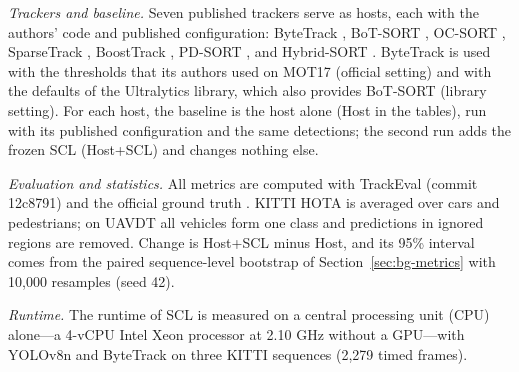 \emph{Trackers and baseline.} Seven published trackers serve as hosts, each with the authors' code and published configuration: ByteTrack \cite{zhang2022bytetrack}, BoT-SORT \cite{aharon2022botsort}, OC-SORT \cite{cao2023ocsort}, SparseTrack \cite{liu2025sparsetrack}, BoostTrack \cite{stanojevic2024boosttrack}, PD-SORT \cite{wang2025pdsort}, and Hybrid-SORT \cite{yang2024hybridsort}. ByteTrack is used with the thresholds that its authors used on MOT17 (official setting) and with the defaults of the Ultralytics library, which also provides BoT-SORT (library setting). For each host, the baseline is the host alone (Host in the tables), run with its published configuration and the same detections; the second run adds the frozen SCL (Host+SCL) and changes nothing else.

\emph{Evaluation and statistics.} All metrics are computed with TrackEval (commit 12c8791) and the official ground truth \cite{dendorfer2021motchallenge}. KITTI HOTA is averaged over cars and pedestrians; on UAVDT all vehicles form one class and predictions in ignored regions are removed. Change is Host+SCL minus Host, and its 95\% interval comes from the paired sequence-level bootstrap of Section~\ref{sec:bg-metrics} with 10,000 resamples (seed 42).

\emph{Runtime.} The runtime of SCL is measured on a central processing unit (CPU) alone---a 4-vCPU Intel Xeon processor at 2.10 GHz without a GPU---with YOLOv8n and ByteTrack on three KITTI sequences (2,279 timed frames).

